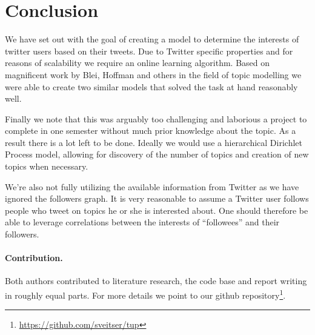 \section{Conclusion}
We have set out with the goal of creating a model to determine the interests of twitter users based on their tweets. Due to Twitter specific properties and for reasons of scalability we require an online learning algorithm. Based on magnificent work by Blei, Hoffman and others in the field of topic modelling we were able to create two similar models that solved the task at hand reasonably well.

Finally we note that this was arguably too challenging and laborious a project to complete in one semester without much prior knowledge about the topic. As a result there is a lot left to be done. Ideally we would use a hierarchical Dirichlet Process model, allowing for discovery of the number of topics and creation of new topics when necessary.

We're also not fully utilizing the available information from Twitter as we have ignored the followers graph. It is very reasonable to assume a Twitter user follows people who tweet on topics he or she is interested about. One should therefore be able to leverage correlations between the interests of ``followees'' and their followers.

\paragraph{Contribution.}
Both authors contributed to literature research, the code base and report writing in roughly equal parts. For more details we point to our github repository\footnote{\url{https://github.com/sveitser/tup}}.